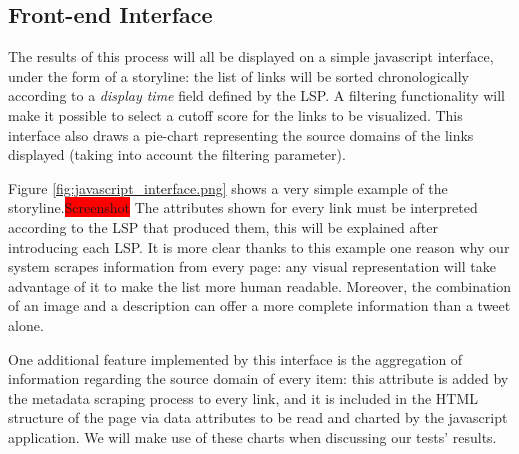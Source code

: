 \documentclass{sig-alternate}
\newcommand{\todo}[1]{\colorbox{red}{#1}}
\begin{document}
\subsection{Front-end Interface}
The results of this process will all be displayed on a simple javascript interface, under the form of a storyline: the list of links will be sorted chronologically according to a \emph{display time} field defined by the LSP. A filtering functionality will make it possible to select a cutoff score for the links to be visualized. This interface also draws a pie-chart representing the source domains of the links displayed (taking into account the filtering parameter).

Figure \ref{fig:javascript_interface.png} shows a very simple example of the storyline.\todo{Screenshot} The attributes shown for every link must be interpreted according to the LSP that produced them, this will be explained after introducing each LSP. It is more clear thanks to this example one reason why our system scrapes information from every page: any visual representation will take advantage of it to make the list more human readable. Moreover, the combination of an image and a description can offer a more complete information than a tweet alone.

One additional feature implemented by this interface is the aggregation of information regarding the source domain of every item: this attribute is added by the metadata scraping process to every link, and it is included in the HTML structure of the page via data attributes to be read and charted by the javascript application. We will make use of these charts when discussing our tests' results.
\end{document}
